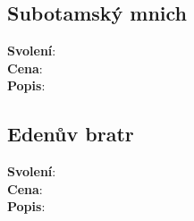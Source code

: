 \documentclass[../main.tex]{subfiles}
\begin{document}
\begin{itemize}
\begin{povolani}
\subsection{Subotamský mnich}
\label{sec:pov-subotam}
\textbf{Svolení}:\\
\textbf{Cena}:\\
\textbf{Popis}:\\
\end{povolani}

\begin{povolani}
\subsection{Edenův bratr}
\label{sec:pov-edenak}
\textbf{Svolení}:\\
\textbf{Cena}:\\
\textbf{Popis}:\\
\end{povolani}

\end{itemize}
\end{document}
